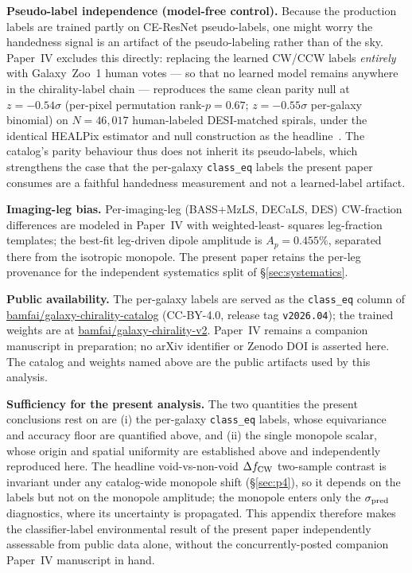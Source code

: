 \documentclass[aps,prd,twocolumn,superscriptaddress,showpacs,preprintnumbers,nofootinbib,longbibliography,floatfix]{revtex4-2}
\begin{document}
\textbf{Pseudo-label independence (model-free control).} Because the
production labels are trained partly on CE-ResNet pseudo-labels, one might
worry the handedness signal is an artifact of the pseudo-labeling rather than
of the sky. Paper~IV excludes this directly: replacing the learned CW/CCW
labels \emph{entirely} with Galaxy~Zoo~1 human votes --- so that no learned
model remains anywhere in the chirality-label chain --- reproduces the same
clean parity null at $z=-0.54\sigma$ (per-pixel permutation rank-$p=0.67$;
$z=-0.55\sigma$ per-galaxy binomial) on $N=46{,}017$ human-labeled DESI-matched
spirals, under the identical HEALPix estimator and null construction as the
headline~\cite{golden_chirality_2026}. The catalog's parity behaviour thus
does not inherit its pseudo-labels, which strengthens the case that the
per-galaxy \texttt{class\_eq} labels the present paper consumes are a faithful
handedness measurement and not a learned-label artifact.

\textbf{Imaging-leg bias.} Per-imaging-leg (BASS+MzLS, DECaLS, DES)
CW-fraction differences are modeled in Paper~IV with weighted-least-
squares leg-fraction templates; the best-fit leg-driven dipole amplitude
is $A_p=0.455\%$, separated there from the isotropic monopole. The
present paper retains the per-leg provenance for the independent
systematics split of \S\ref{sec:systematics}.

\textbf{Public availability.} The per-galaxy labels are served as the
\texttt{class\_eq} column of
\href{https://huggingface.co/datasets/bamfai/galaxy-chirality-catalog}{bamfai/galaxy-chirality-catalog}
(CC-BY-4.0, release tag \texttt{v2026.04}); the trained weights are at
\href{https://huggingface.co/bamfai/galaxy-chirality-v2}{bamfai/galaxy-chirality-v2}.
Paper~IV remains a companion manuscript in preparation; no arXiv identifier
or Zenodo DOI is asserted here. The catalog and weights named above are the
public artifacts used by this analysis.

\textbf{Sufficiency for the present analysis.} The two quantities the
present conclusions rest on are (i) the per-galaxy \texttt{class\_eq}
labels, whose equivariance and accuracy floor are quantified above, and
(ii) the single monopole scalar, whose origin and spatial uniformity are
established above and independently reproduced here. The headline
void-vs-non-void $\Delta f_{\rm CW}$ two-sample contrast is invariant
under any catalog-wide monopole shift (\S\ref{sec:p4}), so it depends on
the labels but not on the monopole amplitude; the monopole enters only
the $\sigma_{\rm pred}$ diagnostics, where its uncertainty is propagated.
This appendix therefore makes the classifier-label environmental result of
the present paper independently assessable from public data alone, without
the concurrently-posted companion Paper~IV manuscript in hand.
\end{document}
